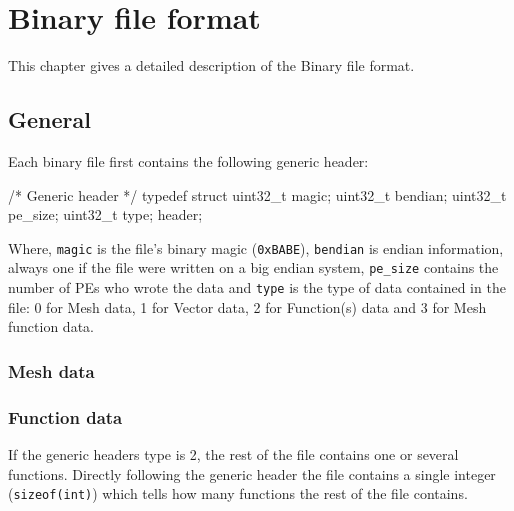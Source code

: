 
\chapter{\dolfin{} Binary file format}
\label{app:dolfin_binary}

This chapter gives a detailed description of the \dolfin{} Binary file format.
\section{General}
Each binary file first contains the following generic header:
\begin{code}
/* Generic header */
typedef struct {
  uint32_t magic;               
  uint32_t bendian;             
  uint32_t pe_size;             
  uint32_t type;                
} header;
\end{code}
Where, \verb|magic| is the file's binary magic (\verb|0xBABE|), \verb|bendian| is endian information, always one if the file were written on a big endian system, \verb|pe_size| contains the number of PEs who wrote the data and \verb|type| is the type of data contained in the file: 0 for Mesh data, 1 for Vector data, 2 for Function(s) data and 3 for Mesh function data.

\subsection{Mesh data}
   
   


\subsection{Function data}
If the generic headers type is 2, the rest of the file contains one or several functions. Directly following the generic header the file contains a single integer (\verb|sizeof(int)|) which tells how many functions the rest of the file contains.




